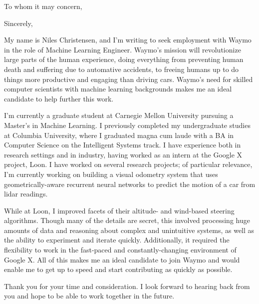 \documentclass[11pt,a4paper,sans]{moderncv}        %
\begin{document}
\date{October 21, 2020}
\opening{To whom it may concern,}
\closing{Sincerely,}
\makelettertitle
My name is Niles Christensen, and I’m writing to seek employment with Waymo in the role of Machine Learning Engineer. Waymo’s mission will revolutionize large parts of the
human experience, doing everything from preventing human death and suffering due to automative accidents, to freeing humans up to do things more productive and engaging than driving cars.
Waymo’s need for skilled computer scientists with machine learning backgrounds makes me an ideal candidate to help further this work.

I’m currently a graduate student at Carnegie Mellon University pursuing a Master's in Machine Learning. I previously completed my undergraduate studies at Columbia University,
where I graduated magna cum laude with a BA in Computer Science on the Intelligent Systems track. I have experience both in research settings and in industry, having worked
as an intern at the Google X project, Loon. I have worked on several research projects; of particular relevance, I'm currently working
on building a visual odometry system that uses geometrically-aware recurrent neural networks to predict the motion of a car from lidar readings.

While at Loon, I improved facets of their altitude- and wind-based steering algorithms. Though many of the details are secret, this involved processing huge amounts of data and reasoning about complex and unintuitive systems,
as well as the ability to experiment and iterate quickly. Additionally, it required the flexibility to work in the fast-paced and constantly-changing environment of Google X.
All of this makes me an ideal candidate to join Waymo and would enable me to get up to speed and start contributing as quickly as possible.

Thank you for your time and consideration. I look forward to hearing back from you and hope to be able to work together in the future.

\makeletterclosing
\end{document}
